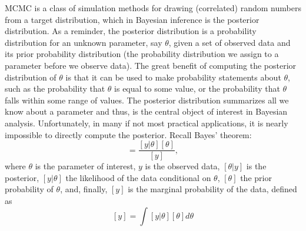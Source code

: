 MCMC is a class of simulation methods for
drawing (correlated) random numbers from a target distribution, which
in Bayesian inference is the posterior distribution.
As a reminder, the posterior distribution is a probability
distribution for an unknown parameter, say $\theta$, given a set of
observed data and its prior probability distribution (the probability
distribution we assign to a parameter before we observe data).  The
great benefit of computing the posterior distribution of $\theta$ is
that it can be used to make probability statements about $\theta$,
such as the probability that $\theta$ is equal to some value, or the
probability that $\theta$ falls within some range of values. 
The posterior distribution summarizes all we know about a parameter
and thus, is the central object of interest in Bayesian
analysis. Unfortunately, in many if not most practical applications,
it is nearly impossible to directly compute the posterior. Recall
Bayes’ theorem:
\begin{equation}
[\theta|y] = \frac{[y|\theta] [\theta]}  {[y]},
\label{mcmc.eq.bayes}
\end{equation}
where $\theta$ is the parameter of interest, $y$ is the observed data,
$[\theta|y]$ is the posterior, $[y|\theta]$ the likelihood of the
data conditional on $\theta$, $[\theta]$ the prior probability of
$\theta$, and, finally, $[y]$ is the marginal probability of the
data, defined as 
\[
[y] = \int [y|\theta]  [\theta] d\theta
\]

